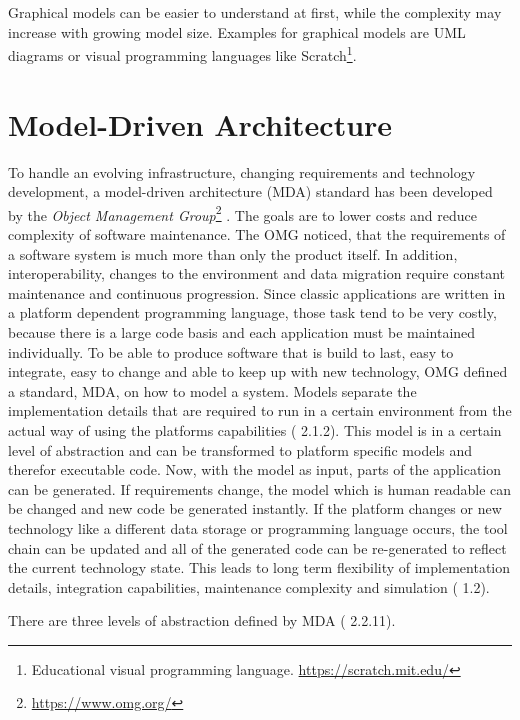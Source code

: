 Graphical models can be easier to understand at first, while the complexity may increase with growing model size.
Examples for graphical models are \ac{UML} diagrams or visual programming languages like Scratch\footnote{Educational visual programming language. \url{https://scratch.mit.edu/}}.

\section{Model-Driven Architecture}
\label{modeldrivenarchitecture}

To handle an evolving infrastructure, changing requirements and technology development, a model-driven architecture (\ac{MDA}) standard has been developed by the \textit{Object Management Group}\footnote{\url{https://www.omg.org/}} \cite{miller_mda_2003}.
The goals are to lower costs and reduce complexity of software maintenance.
The \ac{OMG} noticed, that the requirements of a software system is much more than only the product itself.
In addition, interoperability, changes to the environment and data migration require constant maintenance and continuous progression.
Since classic applications are written in a platform dependent programming language, those task tend to be very costly, because there is a large code basis and each application must be maintained individually.
To be able to produce software that is build to last, easy to integrate, easy to change and able to keep up with new technology, \ac{OMG} defined a standard, \ac{MDA}, on how to model a system.
Models separate the implementation details that are required to run in a certain environment from the actual way of using the platforms capabilities (\cite{miller_mda_2003} 2.1.2).
This model is in a certain level of abstraction and can be transformed to platform specific models and therefor executable code.
Now, with the model as input, parts of the application can be generated.
If requirements change, the model which is human readable can be changed and new code be generated instantly.
If the platform changes or new technology like a different data storage or programming language occurs, the tool chain can be updated and all of the generated code can be re-generated to reflect the current technology state.
This leads to long term flexibility of implementation details, integration capabilities, maintenance complexity and simulation (\cite{miller_mda_2003} 1.2).

There are three levels of abstraction defined by \ac{MDA} (\cite{miller_mda_2003} 2.2.11).

